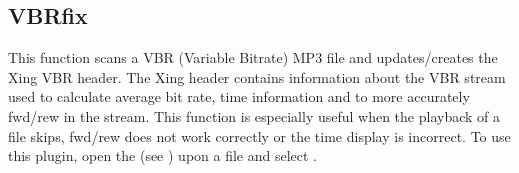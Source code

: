 \subsection{VBRfix}
This function scans a VBR (Variable Bitrate)
MP3 file and updates/creates the Xing VBR header. The Xing header
contains information about the VBR stream used to calculate average bit
rate, time information and to more accurately fwd/rew in the stream.
This function is especially useful when the playback of a file skips,
fwd/rew does not work correctly or the time display is incorrect.
To use this plugin, open the  (see )
upon a  file and select .

